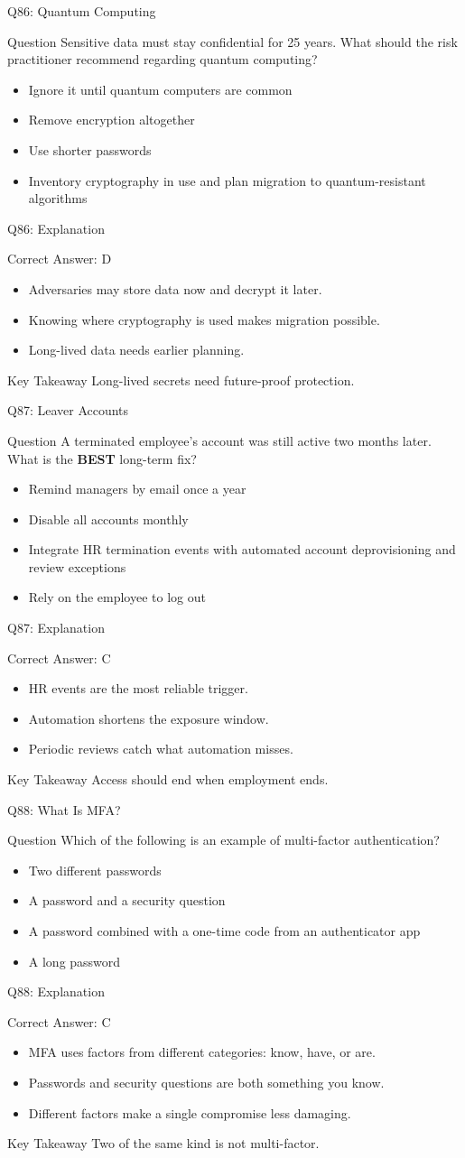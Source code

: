 \documentclass[aspectratio=169]{beamer}
\newcommand{\hq}[7]{%
	\begin{frame}{Q#1: #2}
		\begin{block}{Question}
			#3
		\end{block}
		\begin{itemize}
			#4
		\end{itemize}
	\end{frame}
	\begin{frame}{Q#1: Explanation}
		\begin{block}{Correct Answer: #5}
			\begin{itemize}
				#6
			\end{itemize}
		\end{block}
		\begin{alertblock}{Key Takeaway}
			#7
		\end{alertblock}
	\end{frame}
}
\begin{document}
	\hq{86}{Quantum Computing}
	{Sensitive data must stay confidential for 25 years. What should the risk practitioner recommend regarding quantum computing?}
	{\item[\textbf{(A)}] Ignore it until quantum computers are common
		\item[\textbf{(B)}] Remove encryption altogether
		\item[\textbf{(C)}] Use shorter passwords
		\item[\textbf{(D)}] Inventory cryptography in use and plan migration to quantum-resistant algorithms}
	{D}
	{\item Adversaries may store data now and decrypt it later.
		\item Knowing where cryptography is used makes migration possible.
		\item Long-lived data needs earlier planning.}
	{Long-lived secrets need future-proof protection.}
	
	\hq{87}{Leaver Accounts}
	{A terminated employee's account was still active two months later. What is the \textbf{BEST} long-term fix?}
	{\item[\textbf{(A)}] Remind managers by email once a year
		\item[\textbf{(B)}] Disable all accounts monthly
		\item[\textbf{(C)}] Integrate HR termination events with automated account deprovisioning and review exceptions
		\item[\textbf{(D)}] Rely on the employee to log out}
	{C}
	{\item HR events are the most reliable trigger.
		\item Automation shortens the exposure window.
		\item Periodic reviews catch what automation misses.}
	{Access should end when employment ends.}
	
	\hq{88}{What Is MFA?}
	{Which of the following is an example of multi-factor authentication?}
	{\item[\textbf{(A)}] Two different passwords
		\item[\textbf{(B)}] A password and a security question
		\item[\textbf{(C)}] A password combined with a one-time code from an authenticator app
		\item[\textbf{(D)}] A long password}
	{C}
	{\item MFA uses factors from different categories: know, have, or are.
		\item Passwords and security questions are both something you know.
		\item Different factors make a single compromise less damaging.}
	{Two of the same kind is not multi-factor.}
	
\end{document}
